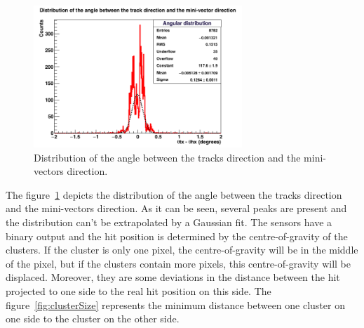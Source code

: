    \begin{figure}[!h]
     \centering
     \includegraphics[width = 0.7\textwidth]{Pictures/deformation/hDiffAngleX_226056.png}
     \caption{Distribution of the angle between the tracks direction and the mini-vectors direction.}
     \label{fig:angRes}
   \end{figure}

   The figure~\ref{fig:angRes} depicts the distribution of the angle between the tracks direction and the mini-vectors direction.
   As it can be seen, several peaks are present and the distribution can't be extrapolated by a Gaussian fit.
   The sensors have a binary output and the hit position is determined by the centre-of-gravity of the clusters.
   If the cluster is only one pixel, the centre-of-gravity will be in the middle of the pixel, but if the clusters contain more pixels, this centre-of-gravity will be displaced.
   Moreover, they are some deviations in the distance between the hit projected to one side to the real hit position on this side.
   The figure~\ref{fig:clusterSize} represents the minimum distance between one cluster on one side to the cluster on the other side.
   
